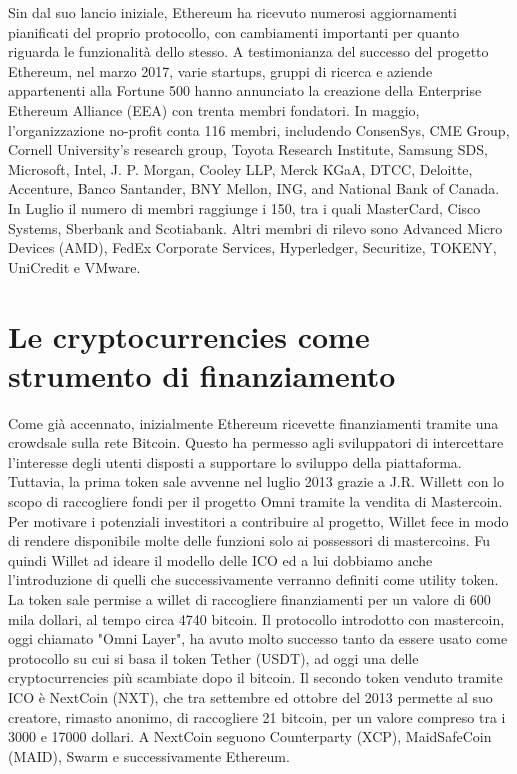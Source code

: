 Sin dal suo lancio iniziale, Ethereum ha ricevuto numerosi aggiornamenti pianificati del proprio protocollo, con cambiamenti importanti per quanto riguarda le funzionalità dello stesso. 
A testimonianza del successo del progetto Ethereum, nel marzo 2017, varie startups, gruppi di ricerca e aziende appartenenti alla Fortune 500 hanno annunciato la creazione della Enterprise Ethereum Alliance (EEA) con trenta membri fondatori. 
In maggio, l'organizzazione no-profit conta 116 membri, includendo ConsenSys, CME Group, Cornell University's research group, Toyota Research Institute, Samsung SDS, Microsoft, Intel, J. P. Morgan, Cooley LLP, Merck KGaA, DTCC, Deloitte, Accenture, Banco Santander, BNY Mellon, ING, and National Bank of Canada.
In Luglio il numero di membri raggiunge i 150, tra i quali MasterCard, Cisco Systems, Sberbank and Scotiabank. Altri membri di rilevo sono Advanced Micro Devices (AMD), FedEx Corporate Services, Hyperledger, Securitize, TOKENY, UniCredit e VMware.

\section{Le cryptocurrencies come strumento di finanziamento}
Come già accennato, inizialmente Ethereum ricevette finanziamenti tramite una crowdsale sulla rete Bitcoin.  Questo ha permesso agli sviluppatori di intercettare l'interesse degli utenti disposti a supportare lo sviluppo della piattaforma. Tuttavia, la prima token sale avvenne nel luglio 2013 grazie a J.R. Willett con lo scopo di raccogliere fondi per il progetto Omni tramite la vendita di Mastercoin. Per motivare i potenziali investitori a contribuire al progetto, Willet fece in modo di rendere disponibile molte delle funzioni solo ai possessori di mastercoins. Fu quindi Willet ad ideare il modello delle ICO ed a lui dobbiamo anche l'introduzione di quelli che successivamente verranno definiti come utility token. La token sale permise a willet di raccogliere finanziamenti per un valore di 600 mila dollari, al tempo circa 4740 bitcoin. Il protocollo introdotto con mastercoin, oggi chiamato "Omni Layer", ha avuto molto successo tanto da essere usato come protocollo su cui si basa il token Tether (USDT), ad oggi una delle cryptocurrencies più scambiate dopo il bitcoin. 
Il secondo token venduto tramite ICO è NextCoin (NXT), che tra settembre ed ottobre del 2013 permette al suo creatore, rimasto anonimo, di raccogliere 21 bitcoin, per un valore compreso tra i 3000 e 17000 dollari. A NextCoin seguono Counterparty (XCP), MaidSafeCoin (MAID), Swarm e successivamente Ethereum. 

